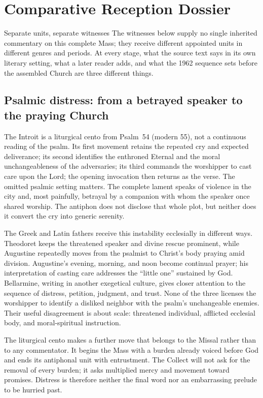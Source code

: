 \section*{Comparative Reception Dossier}

\begin{massbox}{Separate units, separate witnesses}
The witnesses below supply no single inherited commentary on this complete
Mass; they receive different appointed units in different genres and periods.
At every stage, what the source text says in its own literary setting, what a
later reader adds, and what the 1962 sequence sets before the assembled Church
are three different things.
\end{massbox}

\subsection*{Psalmic distress: from a betrayed speaker to the praying Church\enspace{}}

The Introit is a liturgical cento from Psalm~54 (modern 55), not a continuous
reading of the psalm. Its first movement retains the repeated cry and expected
deliverance; its second identifies the enthroned Eternal and the moral
unchangeableness of the adversaries; its third commands the worshipper to cast
care upon the Lord; the opening invocation then returns as the verse. The
omitted psalmic setting matters. The complete lament speaks of violence in the
city and, most painfully, betrayal by a companion with whom the speaker once
shared worship. The antiphon does not disclose that whole plot, but neither
does it convert the cry into generic serenity.

The Greek and Latin fathers receive this instability ecclesially in different
ways. Theodoret keeps the threatened speaker and divine rescue prominent,
while Augustine repeatedly moves from the psalmist to Christ's body praying
amid division. Augustine's evening, morning, and noon become continual prayer;
his interpretation of casting care addresses the ``little one'' sustained by
God. Bellarmine, writing in another exegetical culture, gives closer attention
to the sequence of distress, petition, judgment, and trust. None of the three
licenses the worshipper to identify a disliked neighbor with the psalm's
unchangeable enemies. Their useful disagreement is about scale: threatened
individual, afflicted ecclesial body, and moral-spiritual instruction.

The liturgical cento makes a further move that belongs to the Missal rather
than to any commentator. It begins the Mass with a burden already voiced before
God and ends its antiphonal unit with entrustment. The Collect will not ask for
the removal of every burden; it asks multiplied mercy and movement toward
promises. Distress is therefore neither the final word nor an embarrassing
prelude to be hurried past.

